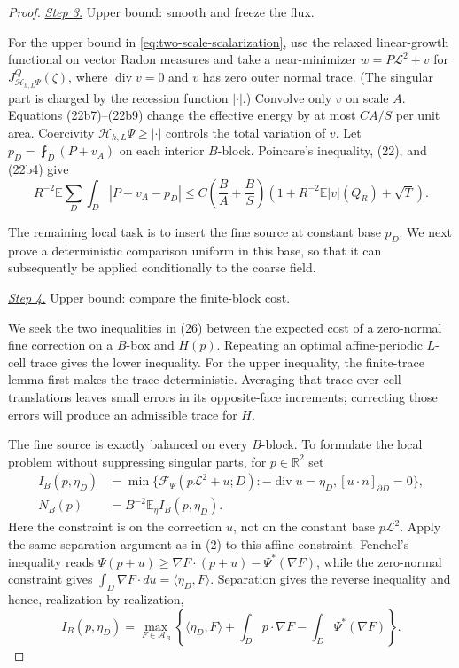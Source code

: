 \documentclass{smfart}
\theoremstyle{definition}
\newcommand{\1}{\mathbf 1}
\begin{document}
\begin{proof}
\smallskip\noindent
\underline{\textit{Step 3.}} Upper bound: smooth and freeze the flux.

For the upper bound in \eqref{eq:two-scale-scalarization}, use the relaxed linear-growth functional on
vector Radon measures and take a near-minimizer
$w=P\mathcal L^2+v$ for
$J_ {\mathcal H_ {h,L}\Psi}^Q(\zeta)$, where
$\operatorname {div}v=0$ and $v$ has zero outer normal trace.
(The singular part is charged by the recession
function $|\cdot|$.) Convolve only $v$ on scale $A$.  Equations
(22b7)--(22b9) change the effective energy by at most $CA/S$ per unit
area.  Coercivity
$\mathcal H_ {h,L}\Psi\geq|\cdot|$ controls the total variation of $v$.
Let $p_ D=\fint_ D(P+v_ A)$ on each interior $B$-block.  Poincare's
inequality, (22), and (22b4) give
\begin{equation}
R^{-2}\mathbb E\sum_ D\int_ D|P+v_ A-p_ D|
\leq C\left(\frac BA+\frac BS\right)
\left(1+R^{-2}\mathbb E|v|(Q_ R)+\sqrt T\right).
\tag{25}
\end{equation}

The remaining local task is to insert the fine source at constant base
$p_D$.  We next prove a deterministic comparison uniform in this base,
so that it can subsequently be applied conditionally to the coarse field.

\smallskip\noindent
\underline{\textit{Step 4.}} Upper bound: compare the finite-block cost.

We seek the two inequalities in (26) between the expected cost of a
zero-normal fine correction on a $B$-box and $H(p)$.  Repeating an
optimal affine-periodic $L$-cell trace gives the lower inequality.  For
the upper inequality, the finite-trace lemma first makes the trace
deterministic.  Averaging that trace over cell translations leaves small
errors in its opposite-face increments; correcting those errors will
produce an admissible trace for $H$.

The fine source is exactly balanced on every $B$-block.  To formulate
the local problem without suppressing singular parts, for $p\in
\mathbb R^2$ set
\begin{equation}
\begin{split}
I_ B(p,\eta_ D)&=\min\{\mathcal F_ \Psi(p\mathcal L^2+u;D):
-\operatorname {div}u=\eta_ D, [u\cdot n]_ {\partial D}=0\},\\
N_ B(p)&=B^{-2}\mathbb E_ \eta I_ B(p,\eta_ D).                    
\end{split}
\tag{25a0}
\end{equation}
Here the constraint is on the correction $u$, not on the constant
base $p\mathcal L^2$.  Apply the same separation argument as in (2)
to this affine constraint.  Fenchel's inequality reads
$\Psi(p+u)\geq\nabla F\cdot(p+u)-\Psi^*(\nabla F)$, while the
zero-normal constraint gives
$\int_ D\nabla F\cdot du=\langle\eta_ D,F\rangle$.  Separation gives
the reverse inequality and hence, realization by realization,
\begin{equation}
I_ B(p,\eta_ D)=\max_ {F\in\mathscr A_ B}
\left\{\langle\eta_ D,F\rangle+
\int_ Dp\cdot\nabla F-\int_ D\Psi^*(\nabla F)\right\}.
\tag{25a1}
\end{equation}


\end{proof}
\end{document}
